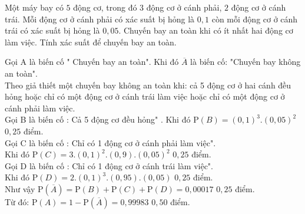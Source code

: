 \begin{bt}[1,5 điểm]%
Một máy bay có $5$ động cơ, trong đó $3$ động cơ ở cánh phải, $2$ động cơ ở cánh trái. Mỗi động cơ ở cánh phải có xác suất bị hỏng là $0,1$ còn mỗi động cơ ở cánh trái có xác suất bị hỏng là $0,05$. Chuyến bay an toàn khi có ít nhất hai động cơ làm việc. Tính xác suất để chuyến bay an toàn.
	\loigiai
	{	Gọi A là biến cố " Chuyến bay an toàn". Khi đó $\overline{A}$ là biến cố: "Chuyến bay không an toàn".\\
		Theo giả thiết một chuyến bay không an toàn khi: cả 5 động cơ ở hai cánh đều hỏng hoặc chỉ có một động cơ ở cánh trái làm việc hoặc chỉ có một động cơ ở cánh phải làm việc.\\
		Gọi B là biến cố : Cả 5 động cơ đều hỏng" . Khi đó $\mathrm{P}(B)={{(0,1)}^{3}}.{{(0,05)}^{2}}$ \dotfill $0,25$ điểm.\\
		Gọi C là biến cố : Chỉ có 1 động cơ ở cánh phải làm việc".\\
		Khi đó $\mathrm{P}(C)=3.{{(0,1)}^{2}}.(0,9).{{(0,05)}^{2}}$ \dotfill $0,25$ điểm.\\
		Gọi D là biến cố : Chỉ có 1 động cơ ở cánh trái làm việc". \\
		Khi đó $\mathrm{P}(D)=2.{{(0,1)}^{3}}.(0,95).(0,05)$ \dotfill $0,25$ điểm.\\
		Như vậy $\mathrm{P}(\overline{A})=\mathrm{P}(B)+\mathrm{P}(C)+\mathrm{P}(D)=0,00017$ \dotfill $0,25$ điểm.\\
		Từ đó: $\mathrm{P}(A)=1-\mathrm{P}(\overline{A})=0,99983$ 	\dotfill $0,50$ điểm.
		
	}
\end{bt}
